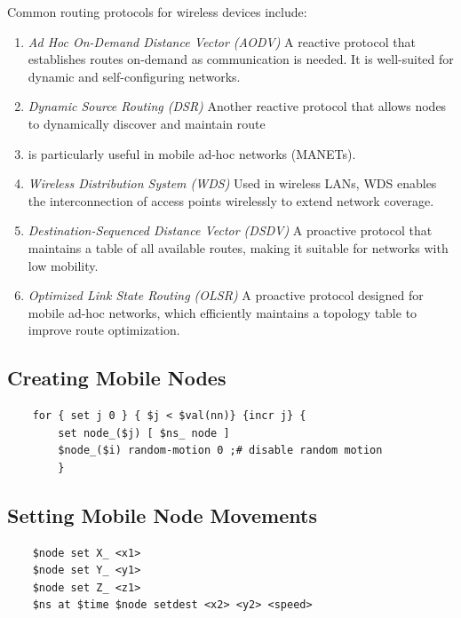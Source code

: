 \documentclass[11pt]{article}
\begin{document}
Common routing protocols for wireless devices include:
\begin{enumerate}
    \item \textit{Ad Hoc On-Demand Distance Vector (AODV)}
          A reactive protocol that establishes routes on-demand as communication is needed. It is well-suited for dynamic and self-configuring networks.

    \item \textit{Dynamic Source Routing (DSR)}
          Another reactive protocol that allows nodes to dynamically discover and maintain route\item  is particularly useful in mobile ad-hoc networks (MANETs).

    \item \textit{Wireless Distribution System (WDS)}
          Used in wireless LANs, WDS enables the interconnection of access points wirelessly to extend network coverage.

    \item \textit{Destination-Sequenced Distance Vector (DSDV)}
          A proactive protocol that maintains a table of all available routes, making it suitable for networks with low mobility.

    \item \textit{Optimized Link State Routing (OLSR)}
          A proactive protocol designed for mobile ad-hoc networks, which efficiently maintains a topology table to improve route optimization.
\end{enumerate}

\subsection{Creating Mobile Nodes}

\begin{verbatim}
    for { set j 0 } { $j < $val(nn)} {incr j} {
        set node_($j) [ $ns_ node ]
        $node_($i) random-motion 0 ;# disable random motion
        }
\end{verbatim}

\subsection{Setting Mobile Node Movements}

\begin{verbatim}
    $node set X_ <x1>
    $node set Y_ <y1>
    $node set Z_ <z1>
    $ns at $time $node setdest <x2> <y2> <speed>
\end{verbatim}
\end{document}
